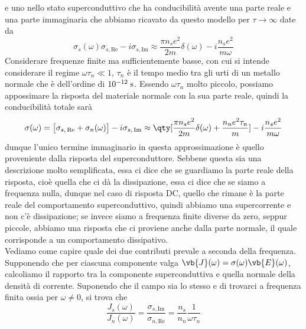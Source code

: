 e uno nello stato superconduttivo che ha conducibilità avente una parte reale e una parte immaginaria che abbiamo ricavato da questo modello per $\tau \to \infty$ date da
\begin{equation*}
   \sigma_s(\omega)
   \sigma_{s,\text{Re}} - i \sigma_{s,\text{Im}}
   \approx \frac{\pi n_s e^2}{2 m} \delta(\omega) - i \frac{n_s e^2}{m \omega}
\end{equation*}
Considerare frequenze finite ma sufficientemente basse, con cui si intende considerare il regime $\omega \tau_n \ll 1$, $\tau_n$ è il tempo medio tra gli urti di un metallo normale che è dell'ordine di $10^{-12} \; \rm s$. Essendo $\omega \tau_n$ molto piccolo, possiamo appossimare la risposta del materiale normale con la sua parte reale, quindi la conducibilità totale sarà
\begin{equation*}
   \sigma(\omega)
   =\bigl[ \sigma_{s,\,\text{Re}} + \sigma_n(\omega) \bigr] - i \sigma_{s,\,\text{Im}}
   \approx \qty[ \frac{\pi n_s e^2}{2 m} \delta(\omega) + \frac{n_n e^2 \tau_n}{m}] - i \frac{n_s e^2}{m \omega}
\end{equation*}
dunque l'unico termine immaginario in questa approssimazione è quello proveniente dalla risposta del superconduttore. Sebbene questa sia una descrizione molto semplificata, essa ci dice che se guardiamo la parte reale della risposta, cioè quella che ci dà la dissipazione, essa ci dice che se siamo a frequenza nulla, dunque nel caso di risposta DC, quello che rimane è la parte reale del comportamento superconduttivo, quindi abbiamo una supercorrente e non c'è dissipazione; se invece siamo a frequenza finite diverse da zero, seppur piccole, abbiamo una risposta che ci proviene anche dalla parte normale, il quale corrisponde a un comportamento dissipativo.\\
Vediamo come capire quale dei due contributi prevale a seconda della frequenza. Supponendo che per ciascuna componente valga $\vb{J}(\omega)=\sigma(\omega)\vb{E}(\omega)$, calcoliamo il rapporto tra la componente superconduttiva e quella normale della densità di corrente. Suponendo che il campo sia lo stesso e di trovarci a frequenza finita ossia per $\omega \neq 0$, si trova che
\begin{equation}
   \frac{J_s(\omega)}{J_n(\omega)}
   =\frac{\sigma_{s,\text{Im}}}{\sigma_{n,\text{Re}}}
   =\frac{n_s}{n_n} \frac{1}{\omega \tau_n}
   \label{eq:rapporto_correnti_superconduttiva_normale}
\end{equation}
